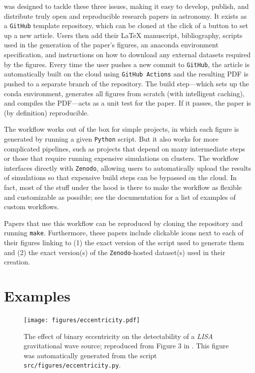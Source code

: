 \documentclass[twocolumn]{aastex631}
\begin{document}
\showyourwork was designed to tackle these three issues, making it easy to develop, publish, and distribute truly open and reproducible research papers in astronomy. 
It exists as a \texttt{GitHub} template repository, which can be cloned at the click of a button to set up a new article. 
Users then add their LaTeX manuscript, bibliography, scripts used in the generation of the paper's figures, an anaconda environment specification, and instructions on how to download any external datasets required by the figures. 
Every time the user pushes a new commit to \texttt{GitHub}, the article is automatically built on the cloud using \texttt{GitHub Actions} and the resulting PDF is pushed to a separate branch of the repository. 
The build step—which sets up the conda environment, generates all figures from scratch (with intelligent caching), and compiles the PDF—acts as a unit test for the paper. 
If it passes, the paper is (by definition) reproducible.

The workflow works out of the box for simple projects, in which each figure is generated by running a given \texttt{Python} script. 
But it also works for more complicated pipelines, such as projects that depend on many intermediate steps or those that require running expensive simulations on clusters. 
The workflow interfaces directly with \texttt{Zenodo}, allowing users to automatically upload the results of simulations so that expensive build steps can be bypassed on the cloud. 
In fact, most of the stuff under the hood is there to make the workflow as flexible and customizable as possible; see the documentation for a list of examples of custom workflows.

Papers that use this workflow can be reproduced by cloning the repository and running \texttt{make}. 
Furthermore, these papers include clickable icons next to each of their figures linking to (1) the exact version of the script used to generate them and (2) the exact version(s) of the \texttt{Zenodo}-hosted dataset(s) used in their creation.

\section{Examples}
\label{sec:examples}

\begin{figure}[ht!]
    \begin{centering}
        \texttt{[image: figures/eccentricity.pdf]}
        \caption{
            The effect of binary eccentricity on the detectability of a \emph{LISA} gravitational wave source; reproduced from Figure 3 in \citet{Wagg2021}. 
            This figure was automatically generated from the script \texttt{src/figures/eccentricity.py}.
        }
        \label{fig:eccentricity}
    \end{centering}
\end{figure}
\end{document}
